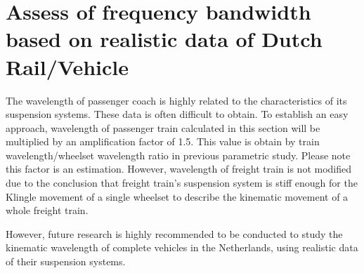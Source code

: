 \section{Assess of frequency bandwidth based on realistic data of Dutch Rail/Vehicle}

The wavelength of passenger coach is highly related to the characteristics of its suspension systems. These data is often difficult to obtain. To establish an easy approach, wavelength of passenger train calculated in this section will be multiplied by an amplification factor of 1.5. This value is obtain by train wavelength/wheelset wavelength ratio in previous parametric study. Please note this factor is an estimation. However, wavelength of freight train is not modified due to the conclusion that freight train's suspension system is stiff enough for the Klingle movement of a single wheelset to describe the kinematic movement of a whole freight train.

However, future research is highly recommended to be conducted to study the kinematic wavelength of complete vehicles in the Netherlands, using realistic data of their suspension systems.


\begin{figure}[h!]
\centering
{}
\end{figure}

\begin{figure}[h!]
\centering
{}

\end{figure}


